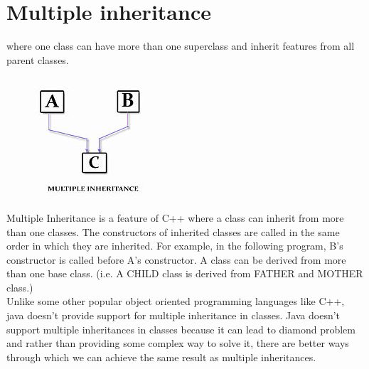 \documentclass[
	12pt, %
]{fphw}
\begin{document}
\section*{{\color{RoyalPurple}Multiple inheritance}}

where one class can have more than one superclass and inherit features from all parent classes.

\begin{figure}[H]
  \centering
  \includegraphics[scale=0.6]{images/170px-Multiple_Inheritance.jpg}
\end{figure}

Multiple Inheritance is a feature of C++ where a class can inherit from more than one classes.  The constructors of inherited classes are called in the same order in which they are inherited. For example, in the following program, B’s constructor is called before A’s constructor. A class can be derived from more than one base class. (i.e. A CHILD class is derived from FATHER and MOTHER class.) \\

Unlike some other popular object oriented programming languages like C++, java doesn’t provide support for multiple inheritance in classes. Java doesn’t support multiple inheritances in classes because it can lead to diamond problem and rather than providing some complex way to solve it, there are better ways through which we can achieve the same result as multiple inheritances.
\end{document}
